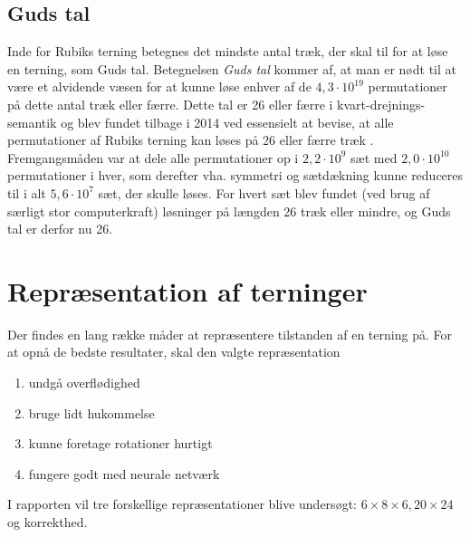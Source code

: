 \documentclass[../main.tex]{subfiles}
\begin{document}
\subsection*{Guds tal}
Inde for Rubiks terning betegnes det mindste antal træk, der skal til for at løse en terning, som Guds tal. Betegnelsen \emph{Guds tal} kommer af, at man er nødt til at være et alvidende væsen for at kunne løse enhver af de $4,3\cdot10^{19}$ permutationer på dette antal træk eller færre. Dette tal er 26 eller færre i kvart-drejnings-semantik og blev fundet tilbage i 2014 ved essensielt at bevise, at alle permutationer af Rubiks terning kan løses på 26 eller færre træk \cite{10.4169/college.math.j.45.4.242}. Fremgangsmåden var at dele alle permutationer op i $2,2\cdot10^9$ sæt med $2,0\cdot10^{10}$ permutationer i hver, som derefter vha. symmetri og sætdækning kunne reduceres til i alt $5,6\cdot10^7$ sæt, der skulle løses. For hvert sæt blev fundet (ved brug af særligt stor computerkraft) løsninger på længden 26 træk eller mindre, og Guds tal er derfor nu 26. 



\section{Repræsentation af terninger}\label{sec:repr}
Der findes en lang række måder at repræsentere tilstanden af en terning på.
For at opnå de bedste resultater, skal den valgte repræsentation
\begin{enumerate}
	\item undgå overflødighed
	\item bruge lidt hukommelse
	\item kunne foretage rotationer hurtigt
	\item fungere godt med neurale netværk
\end{enumerate}
I rapporten vil tre forskellige repræsentationer blive undersøgt: $ 6\times 8\times 6, 20\times 24 $ og korrekthed.
\end{document}
